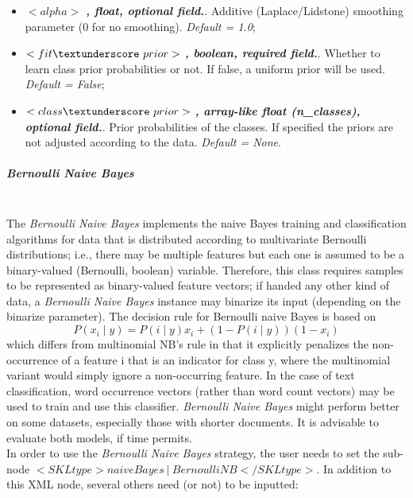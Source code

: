 \begin{itemize}
\item $<alpha>$ \textbf{\textit{, float, optional field.}}.  Additive (Laplace/Lidstone) smoothing parameter (0 for no smoothing). \textit{Default = 1.0};
\item $<fit\textunderscore~prior>$ \textbf{\textit{, boolean, required field.}}.  Whether to learn class prior probabilities or not. If false, a uniform prior will be used. \textit{Default = False};
\item $<class\textunderscore~prior>$ \textbf{\textit{, array-like float (n\_classes), optional field.}}.  Prior probabilities of the classes. If specified the priors are not adjusted according to the data. \textit{Default = None}.
\end{itemize}

\subparagraph{Bernoulli Naive Bayes}
\mbox{}
\\The \textit{Bernoulli Naive Bayes} implements the naive Bayes training and classification algorithms for data that is distributed according to multivariate Bernoulli distributions; i.e., there may be multiple features but each one is assumed to be a binary-valued (Bernoulli, boolean) variable. Therefore, this class requires samples to be represented as binary-valued feature vectors; if handed any other kind of data, a  \textit{Bernoulli Naive Bayes} instance may binarize its input (depending on the binarize parameter).
The decision rule for Bernoulli naive Bayes is based on
\begin{equation}
P(x_i \mid y) = P(i \mid y) x_i + (1 - P(i \mid y)) (1 - x_i)
\end{equation}
which differs from multinomial NB’s rule in that it explicitly penalizes the non-occurrence of a feature i that is an indicator for class y, where the multinomial variant would simply ignore a non-occurring feature.
In the case of text classification, word occurrence vectors (rather than word count vectors) may be used to train and use this classifier.  \textit{Bernoulli Naive Bayes} might perform better on some datasets, especially those with shorter documents. It is advisable to evaluate both models, if time permits.
\\In order to use the   \textit{Bernoulli Naive Bayes} strategy, the user needs to set the sub-node $<SKLtype>naiveBayes~\vert~BernoulliNB</SKLtype>$. In addition to this XML node, several others need (or not) to be inputted:
